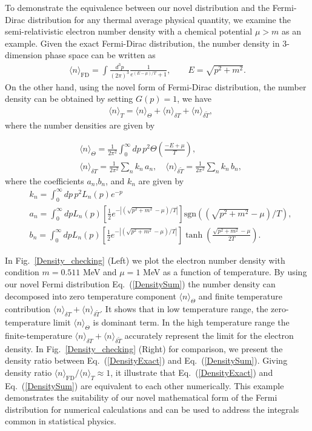 \documentclass[sn-mathphys,Numbered]{sn-jnl}
\begin{document}
To demonstrate the equivalence between our novel distribution and the Fermi-Dirac distribution for any thermal average physical quantity, we examine the semi-relativistic electron number density with a chemical potential $\mu>m$ as an example.  Given the exact Fermi-Dirac distribution, the number density  in $3$-dimension phase space can be written 
as
\begin{align}
\label{DensityExact}
\langle n\rangle _{\mathrm{FD}}=\int\frac{d^3p}{(2\pi)^3}\frac{1}{e^{(E-\mu)/T}+1},\qquad E=\sqrt{p^2+m^2}.
\end{align}
On the other hand, using the novel form of Fermi-Dirac distribution, the number density can be obtained by setting $G(p)=1$, we have
\begin{align}
\label{DensitySum}
&\langle n\rangle_T=\langle n\rangle_\Theta+\langle n\rangle_{\delta T}+\langle n\rangle_{\delta \widetilde T},
\end{align}
where the number densities are given by

\begin{align}
&\langle n\rangle_\Theta=\frac{1}{2\pi^2}\int^\infty_0\!\!dp\,p^2\Theta\left(\frac{-E+\mu}{T}\right),\\
&\langle n\rangle_{\delta T}=\frac{1}{2\pi^2}\sum_n k_n\,a_n,\quad\langle n\rangle_{\delta \widetilde T}=\frac{1}{2\pi^2}\sum_n k_n\,b_n,
\end{align}
where the coefficients $a_n$,$b_n$, and $k_n$ are given by
\begin{align}
&k_n=\int_0^\infty\!\!dp\,p^2L_n(p)e^{-p}\\
&a_n=\int_0^\infty\!\!dpL_n(p)\left[\frac{1}{2}e^{-|(\sqrt{p^2+m^2}-\mu)/T|}\right]\mathrm{sgn}((\sqrt{p^2+m^2}-\mu)/T),\\
&b_n=\int_0^\infty\!\!dpL_n(p)\left[\frac{1}{2}e^{-|(\sqrt{p^2+m^2}-\mu)/T|}\right]\tanh\left(\frac{\sqrt{p^2+m^2}-\mu}{2T}\right).
\end{align}

In Fig.~\ref{Density_checking} (Left) we plot the electron number density with condition $m=0.511$ MeV and $\mu=1$ MeV as a function of temperature. 
By using our novel Fermi distribution Eq.~(\ref{DensitySum}) the number density can decomposed into zero temperature component $\langle n\rangle_\Theta$ and finite temperature contribution $\langle n\rangle_{\delta T}+\langle n\rangle_{\delta \widetilde T}$. It shows that in low temperature range, the zero-temperature limit $\langle n\rangle_\Theta$ is dominant term. In the high temperature range the finite-temperature $\langle n\rangle_{\delta T}+\langle n\rangle_{\delta \widetilde T}$ accurately represent the limit for the electron density. In Fig.~\ref{Density_checking} (Right) for comparison, we present the density ratio between  Eq.~(\ref{DensityExact}) and Eq.~(\ref{DensitySum}). Giving density ratio $\langle n\rangle_{\mathrm{FD}}/\langle n\rangle_T\approx1$, it illustrate that Eq.~(\ref{DensityExact}) and Eq.~(\ref{DensitySum}) are equivalent to each other numerically. This example demonstrates the suitability of our novel mathematical form of the Fermi distribution for numerical calculations and can be used to address the integrals common in statistical
physics.
\end{document}
